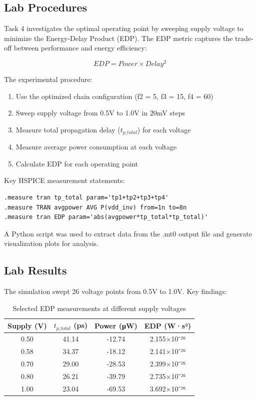\documentclass[UTF8,12pt,a4paper]{ctexart}
\begin{document}
\subsection{Lab Procedures}

Task 4 investigates the optimal operating point by sweeping supply voltage to minimize the Energy-Delay Product (EDP). The EDP metric captures the trade-off between performance and energy efficiency:

\[EDP = Power \times Delay^2\]

The experimental procedure:

\begin{enumerate}
    \item Use the optimized chain configuration (f2 = 5, f3 = 15, f4 = 60)
    \item Sweep supply voltage from 0.5V to 1.0V in 20mV steps
    \item Measure total propagation delay ($t_{p\_total}$) for each voltage
    \item Measure average power consumption at each voltage
    \item Calculate EDP for each operating point
\end{enumerate}

Key HSPICE measurement statements:

\begin{verbatim}
.measure tran tp_total param='tp1+tp2+tp3+tp4'
.measure TRAN avgpower AVG P(vdd_inv) from=1n to=8n
.measure tran EDP param='abs(avgpower*tp_total*tp_total)'
\end{verbatim}

A Python script was used to extract data from the .mt0 output file and generate visualization plots for analysis.

\subsection{Lab Results}

The simulation swept 26 voltage points from 0.5V to 1.0V. Key findings:

\begin{table}[h]
\centering
\begin{tabular}{|c|c|c|c|}
\hline
\textbf{Supply (V)} & \textbf{$t_{p\_total}$ (ps)} & \textbf{Power (μW)} & \textbf{EDP (W·s²)} \\
\hline
0.50 & 41.14 & -12.74 & 2.155×10⁻²⁶ \\
0.58 & 34.37 & -18.12 & 2.141×10⁻²⁶ \\
0.70 & 29.00 & -28.53 & 2.399×10⁻²⁶ \\
0.80 & 26.21 & -39.79 & 2.735×10⁻²⁶ \\
1.00 & 23.04 & -69.53 & 3.692×10⁻²⁶ \\
\hline
\end{tabular}
\caption{Selected EDP measurements at different supply voltages}
\end{table}
\end{document}
